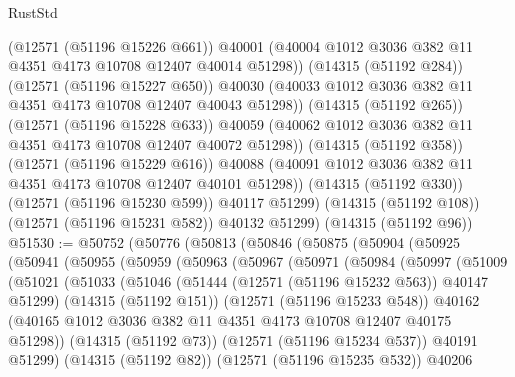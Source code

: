 \begin{lexlean}{RustStd}
\begin{coremodule}
                (@12571 (@51196 @15226 @661))
                @40001
                (@40004 @1012 @3036 @382 @11 @4351 @4173 @10708 @12407 @40014 @51298))
              (@14315 (@51192 @284))
              (@12571 (@51196 @15227 @650))
              @40030
              (@40033 @1012 @3036 @382 @11 @4351 @4173 @10708 @12407 @40043 @51298))
            (@14315 (@51192 @265))
            (@12571 (@51196 @15228 @633))
            @40059
            (@40062 @1012 @3036 @382 @11 @4351 @4173 @10708 @12407 @40072 @51298))
          (@14315 (@51192 @358))
          (@12571 (@51196 @15229 @616))
          @40088
          (@40091 @1012 @3036 @382 @11 @4351 @4173 @10708 @12407 @40101 @51298))
        (@14315 (@51192 @330))
        (@12571 (@51196 @15230 @599))
        @40117
        @51299)
      (@14315 (@51192 @108))
      (@12571 (@51196 @15231 @582))
      @40132
      @51299)
    (@14315 (@51192 @96))
@51530 := @50752
    (@50776
      (@50813
        (@50846
          (@50875
            (@50904
              (@50925
                (@50941
                  (@50955
                    (@50959
                      (@50963
                        (@50967
                          (@50971
                            (@50984
                              (@50997
                                (@51009
                                  (@51021
                                    (@51033
                                      (@51046
                                        (@51444 (@12571 (@51196 @15232 @563)) @40147 @51299)
                                        (@14315 (@51192 @151))
                                        (@12571 (@51196 @15233 @548))
                                        @40162
                                        (@40165
                                          @1012
                                          @3036
                                          @382
                                          @11
                                          @4351
                                          @4173
                                          @10708
                                          @12407
                                          @40175
                                          @51298))
                                      (@14315 (@51192 @73))
                                      (@12571 (@51196 @15234 @537))
                                      @40191
                                      @51299)
                                    (@14315 (@51192 @82))
                                    (@12571 (@51196 @15235 @532))
                                    @40206

\end{coremodule}
\end{lexlean}
